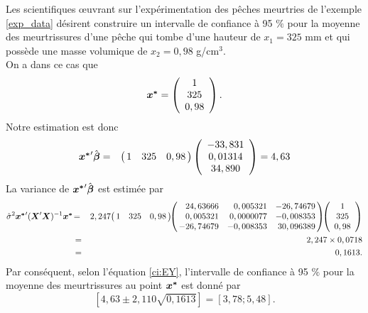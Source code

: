 \vspace{0.05 in}
\begin{exemple}
\label{exp:intconf}
Les scientifiques \oe uvrant sur l'expérimentation des pêches meurtries de l'exemple \ref{exp_data} désirent construire un intervalle de confiance à 95 $\%$ pour la moyenne des meurtrissures d'une pêche qui tombe d'une hauteur de $x_1=325$ mm et qui possède une masse volumique de  $x_2=0,98$ g/cm$^3$. \\
On a dans ce cas que
$$\mbox{\boldmath$x^*$\unboldmath}=\left( \begin{array}{c}
1 \\
325 \\
0,98 \\
\end{array}
\right).
$$
Notre estimation est donc
\begin{eqnarray*}
\mbox{\boldmath$x^*$\unboldmath}'\hat{\mbox{\boldmath$\beta$}} & = & \left(\!\!
\begin{array}{ccc}
1 & 325 &  0,98
\end{array}\!\!\right)
\left(
\begin{array}{c}
-33,831 \\
0,01314 \\
34,890
\end{array}
\right)=4,63
\end{eqnarray*}
La variance de $\mbox{\boldmath$x^*$\unboldmath}'\hat{\mbox{\boldmath$\beta$}}$ est estimée par
\begin{eqnarray*}
\hat{\sigma}^2\bo{x^*}'(\boX'\boX)^{-1}\bo{x^*} &\! =\! & 2,247 \!\left(\!\!
\begin{array}{ccc}
1 & 325 &  0,98
\end{array}\!\!\right)\!\!
\left(\!\!
\begin{array}{rrr}
24,63666 & 0,005321 & -26,74679 \\
0,005321 & 0,0000077 & -0,008353 \\
-26,74679 & -0,008353 & 30,096389
\end{array}
\!\!\right)\!\!
\left( \begin{array}{c}
1 \\
325 \\
0,98 \\
\end{array}
\right) \\
& = & 2,247\times 0,0718 \\
& = & 0,1613.
\end{eqnarray*}
Par conséquent, selon l'équation \eqref{ci:EY}, l'intervalle de confiance à 95 $\%$ pour la moyenne des meurtrissures au point $\mbox{\boldmath$x^*$\unboldmath}$ est donné par
$$\left[4,63\pm 2,110\sqrt{0,1613}\right]=\left[3,78;5,48\right].$$
\end{exemple}

